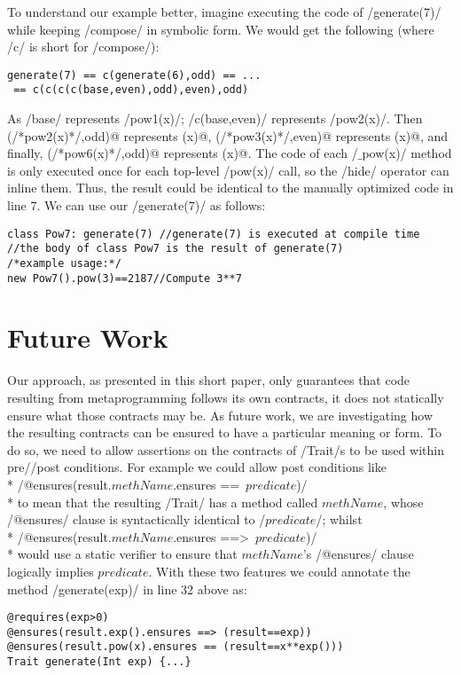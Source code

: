 To understand our example better, imagine executing the code of /generate(7)/ while keeping /compose/ in symbolic form. We would get the following (where /c/ is short for /compose/):
\vspace{-1ex}
\begin{lstlisting}[numbers=none]
generate(7) == c(generate(6),odd) == ...
 == c(c(c(c(base,even),odd),even),odd)
\end{lstlisting}
\vspace{-1ex}
As /base/ represents /pow1(x)/; /c(base,even)/ represents /pow2(x)/. Then \Q@c(/*pow2(x)*/,odd)@ represents (x)@, \Q@c(/*pow3(x)*/,even)@ represents (x)@, and finally,
\Q@c(/*pow6(x)*/,odd)@ represents (x)@.
The code of each /$\_$pow(x)/ method is only executed once for each top-level /pow(x)/ call, so the /hide/ operator can inline them.
Thus, the result could be identical to the manually optimized code in line 7.
We can use our /generate(7)/ as follows:
\begin{lstlisting}
class Pow7: generate(7) //generate(7) is executed at compile time
//the body of class Pow7 is the result of generate(7)
/*example usage:*/
new Pow7().pow(3)==2187//Compute 3**7
\end{lstlisting}

\section{Future Work}
Our approach, as presented in this short paper, only guarantees that code resulting from metaprogramming follows its own contracts, it does
not statically ensure what those contracts may be. As future work, we are investigating how the resulting contracts can be ensured to have a particular meaning or form.
To do so, we need to allow assertions on the contracts of /Trait/s to be used within pre//post conditions.
For example we could allow post conditions like\\*
/@ensures(result.$\mathit{methName}$.ensures ==\ $\mathit{predicate}$)/ \\*
to mean that the resulting /Trait/ has
a method
called $\mathit{methName}$, whose /@ensures/ clause is syntactically identical to  /$predicate$/; whilst
\\*
/@ensures(result.$\mathit{methName}$.ensures ==>\ $\mathit{predicate}$)/
\\*
would use a static verifier to ensure that $\mathit{methName}$'s /@ensures/ clause logically implies $\mathit{predicate}$.
With these two features we could annotate the method /generate(exp)/ in line 32 above as:
\begin{lstlisting}
@requires(exp>0)
@ensures(result.exp().ensures ==> (result==exp))
@ensures(result.pow(x).ensures == (result==x**exp()))
Trait generate(Int exp) {...}
\end{lstlisting}

